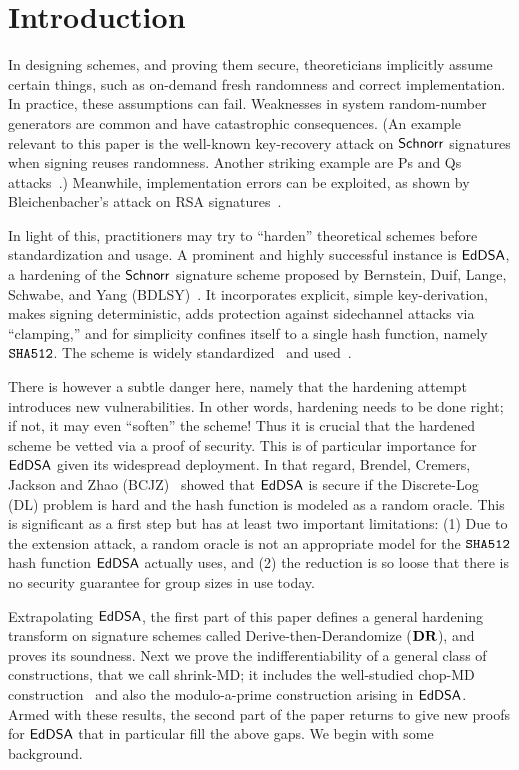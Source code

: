 \section{Introduction}\label{sec:intro}

In designing schemes, and proving them secure, theoreticians implicitly assume certain things, such as on-demand fresh randomness and correct implementation. In practice, these assumptions can fail. Weaknesses in system random-number generators are common and have catastrophic consequences. (An example relevant to this paper is the well-known key-recovery attack on $\mathsf{Schnorr}$ signatures when signing reuses randomness. Another striking example are Ps and Qs attacks~\cite{USENIX:HDWH12,EPRINT:LHABKW12}.) Meanwhile, implementation errors can be exploited, as shown by Bleichenbacher's attack on RSA signatures~\cite{Bl-rump-C06}. 

In light of this, practitioners may try to ``harden'' theoretical schemes before standardization and usage. A prominent and highly successful instance is $\mathsf{EdDSA}$, a hardening of the $\mathsf{Schnorr}$ signature scheme proposed by Bernstein, Duif, Lange, Schwabe, and Yang (BDLSY)~\cite{bernstein2012high}. It incorporates explicit, simple key-derivation, makes signing deterministic, adds protection against sidechannel attacks via ``clamping,'' and for simplicity confines itself to a single hash function, namely $\texttt{SHA512}$. The scheme is widely standardized~\cite{NIST:EdDSA,RFC:EDDSA} and used~\cite{Ed-uses}.

There is however a subtle danger here, namely that the hardening attempt introduces new vulnerabilities. In other words, hardening needs to be done right; if not, it may even ``soften'' the scheme! Thus it is crucial that the hardened scheme be vetted via a proof of security. This is of particular importance for $\mathsf{EdDSA}$ given its widespread deployment. In that regard, Brendel, Cremers, Jackson and Zhao (BCJZ)~\cite{SP:BCJZ21} showed that $\mathsf{EdDSA}$ is secure if the Discrete-Log (DL) problem is hard and the hash function is modeled as a random oracle. This is significant as a first step but has at least two important limitations: (1) Due to the extension attack, a random oracle is not an appropriate model for the $\texttt{SHA512}$ hash function $\mathsf{EdDSA}$ actually uses, and (2) the reduction is so loose that there is no security guarantee for group sizes in use today. 

Extrapolating $\mathsf{EdDSA}$, the first part of this paper defines a general hardening transform on signature schemes called Derive-then-Derandomize ($\mathbf{DR}$), and proves its soundness. Next we prove the indifferentiability of a general class of constructions, that we call shrink-MD; %
it includes the well-studied chop-MD construction~\cite{C:CDMP05} and also the modulo-a-prime construction arising in $\mathsf{EdDSA}$. 
Armed with these results, the second part of the paper returns to give new proofs for $\mathsf{EdDSA}$ that in particular fill the above gaps.
We begin with some background.

